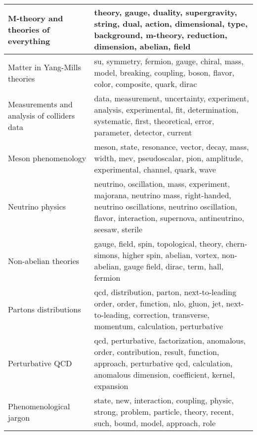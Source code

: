 \begin{longtable}[H]{p{}|p{}}
M-theory and theories of everything                   &                                                                  theory, gauge, duality, supergravity, string, dual, action, dimensional, type, background, m-theory, reduction, dimension, abelian, field \\ \midrule
Matter in Yang-Mills theories                         &                                                                                       su, symmetry, fermion, gauge, chiral, mass, model, breaking, coupling, boson, flavor, color, composite, quark, dirac \\ \midrule
Measurements and analysis of colliders data           &                                                data, measurement, uncertainty, experiment, analysis, experimental, fit, determination, systematic, first, theoretical, error, parameter, detector, current \\ \midrule
Meson phenomenology                                   &                                                                                meson, state, resonance, vector, decay, mass, width, mev, pseudoscalar, pion, amplitude, experimental, channel, quark, wave \\ \midrule
Neutrino physics                                      &                 neutrino, oscillation, mass, experiment, majorana, neutrino mass, right-handed, neutrino oscillations, neutrino oscillation, flavor, interaction, supernova, antineutrino, seesaw, sterile \\ \midrule
Non-abelian theories                                  &                                                                  gauge, field, spin, topological, theory, chern-simons, higher spin, abelian, vortex, non-abelian, gauge field, dirac, term, hall, fermion \\ \midrule
Partons distributions                                 &                                           qcd, distribution, parton, next-to-leading order, order, function, nlo, gluon, jet, next-to-leading, correction, transverse, momentum, calculation, perturbative \\ \midrule
Perturbative QCD                                      &                           qcd, perturbative, factorization, anomalous, order, contribution, result, function, approach, perturbative qcd, calculation, anomalous dimension, coefficient, kernel, expansion \\ \midrule
Phenomenological jargon                               &                                                                                   state, new, interaction, coupling, physic, strong, problem, particle, theory, recent, such, bound, model, approach, role \\ \midrule

\end{longtable}
